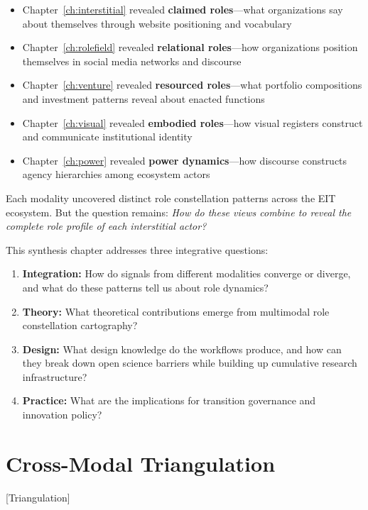 \documentclass[../main.tex]{subfiles}
\begin{document}
\begin{itemize}[leftmargin=*, itemsep=0.3em]
\item Chapter~\ref{ch:interstitial} revealed \textbf{claimed roles}---what organizations say about themselves through website positioning and vocabulary
\item Chapter~\ref{ch:rolefield} revealed \textbf{relational roles}---how organizations position themselves in social media networks and discourse
\item Chapter~\ref{ch:venture} revealed \textbf{resourced roles}---what portfolio compositions and investment patterns reveal about enacted functions
\item Chapter~\ref{ch:visual} revealed \textbf{embodied roles}---how visual registers construct and communicate institutional identity
\item Chapter~\ref{ch:power} revealed \textbf{power dynamics}---how discourse constructs agency hierarchies among ecosystem actors
\end{itemize}

Each modality uncovered distinct role constellation patterns across the EIT ecosystem. But the question remains: \emph{How do these views combine to reveal the complete role profile of each interstitial actor?}

This synthesis chapter addresses three integrative questions:

\begin{enumerate}
    \item \textbf{Integration:} How do signals from different modalities converge or diverge, and what do these patterns tell us about role dynamics?
    \item \textbf{Theory:} What theoretical contributions emerge from multimodal role constellation cartography?
    \item \textbf{Design:} What design knowledge do the workflows produce, and how can they break down open science barriers while building up cumulative research infrastructure?
    \item \textbf{Practice:} What are the implications for transition governance and innovation policy?
\end{enumerate}

\section{Cross-Modal Triangulation}[Triangulation]
\end{document}
